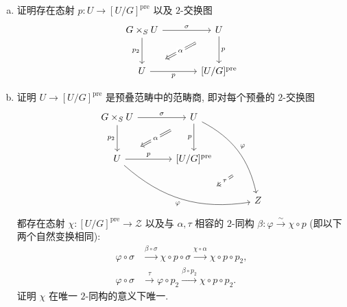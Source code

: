 \begin{exercise}[有益的练习]\label{src:3.4.27}
\begin{enumerate}[(a)]
\item 证明存在态射 $p:U\to[U/G]^{\mathrm{pre}}$ 以及 $2$-交换图
\[
\begin{tikzcd}[column sep=large,row sep=large]
G\times_S U\arrow[r,"\sigma"]\arrow[d,"p_2"']&U\arrow[d,"p"]\\
U\arrow[r,"p"']&{[U/G]^{\mathrm{pre}}}
\arrow[Rightarrow,from=1-2,to=2-1,shorten <=1.8em,shorten >=1.8em,"\alpha" description]
\end{tikzcd}
\]
\item 证明 $U\to[U/G]^{\mathrm{pre}}$ 是预叠范畴中的范畴商, 即对每个预叠的 $2$-交换图
\[
\begin{tikzcd}[column sep=large,row sep=large]
G\times_S U\arrow[r,"\sigma"]\arrow[d,"p_2"']&
U\arrow[d,"p"']\arrow[ddr,bend left=25,"\varphi"]&\\
U\arrow[r,"p"]\arrow[drr,bend right=25,"\varphi"']&
{[U/G]^{\mathrm{pre}}}&{}\\
&{}&\mathcal Z
\arrow[Rightarrow,from=1-2,to=2-1,shorten <=1.8em,shorten >=1.8em,"\alpha" description]
\arrow[Rightarrow,from=2-3,to=3-2,shorten <=2.6em,shorten >=2.6em,"\tau" description]
\end{tikzcd}
\]
都存在态射 $\chi:[U/G]^{\mathrm{pre}}\to\mathcal Z$ 以及与 $\alpha,\tau$ 相容的 $2$-同构 $\beta:\varphi\xrightarrow{\sim}\chi\circ p$ (即以下两个自然变换相同):
\[
\begin{aligned}
\varphi\circ\sigma&\xrightarrow{\beta\circ\sigma}\chi\circ p\circ\sigma
\xrightarrow{\chi\circ\alpha}\chi\circ p\circ p_2,\\
\varphi\circ\sigma&\xrightarrow{\tau}\varphi\circ p_2
\xrightarrow{\beta\circ p_2}\chi\circ p\circ p_2.
\end{aligned}
\]
证明 $\chi$ 在唯一 $2$-同构的意义下唯一.
\end{enumerate}
\end{exercise}
